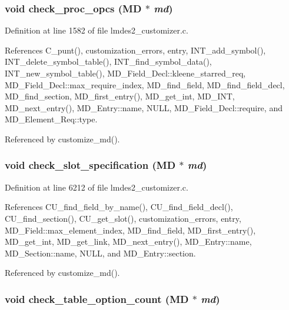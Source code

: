 \subsubsection{\setlength{\rightskip}{0pt plus 5cm}void check\_\-proc\_\-opcs (\bf{MD} $\ast$ {\em md})}\label{lmdes2__customizer_8c_9bfc7ce417705fe84aae84f4d1403015}




Definition at line 1582 of file lmdes2\_\-customizer.c.

References C\_\-punt(), customization\_\-errors, entry, INT\_\-add\_\-symbol(), INT\_\-delete\_\-symbol\_\-table(), INT\_\-find\_\-symbol\_\-data(), INT\_\-new\_\-symbol\_\-table(), MD\_\-Field\_\-Decl::kleene\_\-starred\_\-req, MD\_\-Field\_\-Decl::max\_\-require\_\-index, MD\_\-find\_\-field, MD\_\-find\_\-field\_\-decl, MD\_\-find\_\-section, MD\_\-first\_\-entry(), MD\_\-get\_\-int, MD\_\-INT, MD\_\-next\_\-entry(), MD\_\-Entry::name, NULL, MD\_\-Field\_\-Decl::require, and MD\_\-Element\_\-Req::type.

Referenced by customize\_\-md().
\subsubsection{\setlength{\rightskip}{0pt plus 5cm}void check\_\-slot\_\-specification (\bf{MD} $\ast$ {\em md})}\label{lmdes2__customizer_8c_e58a6292d04bae2e646a784873aff4da}




Definition at line 6212 of file lmdes2\_\-customizer.c.

References CU\_\-find\_\-field\_\-by\_\-name(), CU\_\-find\_\-field\_\-decl(), CU\_\-find\_\-section(), CU\_\-get\_\-slot(), customization\_\-errors, entry, MD\_\-Field::max\_\-element\_\-index, MD\_\-find\_\-field, MD\_\-first\_\-entry(), MD\_\-get\_\-int, MD\_\-get\_\-link, MD\_\-next\_\-entry(), MD\_\-Entry::name, MD\_\-Section::name, NULL, and MD\_\-Entry::section.

Referenced by customize\_\-md().
\subsubsection{\setlength{\rightskip}{0pt plus 5cm}void check\_\-table\_\-option\_\-count (\bf{MD} $\ast$ {\em md})}\label{lmdes2__customizer_8c_d7581428a805b5351485f9d09da4aad0}




